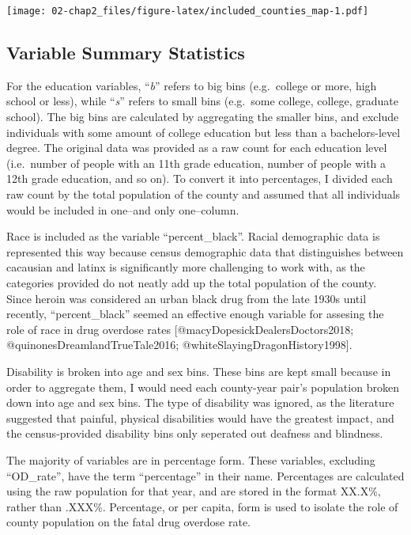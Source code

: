 \documentclass[
]{article}
\begin{document}
\texttt{[image: 02-chap2\_files/figure-latex/included\_counties\_map-1.pdf]}

\hypertarget{variable-summary-statistics}{%
\subsection{Variable Summary
Statistics}\label{variable-summary-statistics}}

For the education variables, ``\emph{b}'' refers to big bins
(e.g.~college or more, high school or less), while ``\emph{s}'' refers
to small bins (e.g.~some college, college, graduate school). The big
bins are calculated by aggregating the smaller bins, and exclude
individuals with some amount of college education but less than a
bachelors-level degree. The original data was provided as a raw count
for each education level (i.e.~number of people with an 11th grade
education, number of people with a 12th grade education, and so on). To
convert it into percentages, I divided each raw count by the total
population of the county and assumed that all individuals would be
included in one--and only one--column.

Race is included as the variable ``percent\_black''. Racial demographic
data is represented this way because census demographic data that
distinguishes between cacausian and latinx is significantly more
challenging to work with, as the categories provided do not neatly add
up the total population of the county. Since heroin was considered an
urban black drug from the late 1930s until recently, ``percent\_black''
seemed an effective enough variable for assesing the role of race in
drug overdose rates {[}@macyDopesickDealersDoctors2018;
@quinonesDreamlandTrueTale2016; @whiteSlayingDragonHistory1998{]}.

Disability is broken into age and sex bins. These bins are kept small
because in order to aggregate them, I would need each county-year pair's
population broken down into age and sex bins. The type of disability was
ignored, as the literature suggested that painful, physical disabilities
would have the greatest impact, and the census-provided disability bins
only seperated out deafness and blindness.

The majority of variables are in percentage form. These variables,
excluding ``OD\_rate'', have the term ``percentage'' in their name.
Percentages are calculated using the raw population for that year, and
are stored in the format XX.X\%, rather than .XXX\%. Percentage, or per
capita, form is used to isolate the role of county population on the
fatal drug overdose rate.
\end{document}
